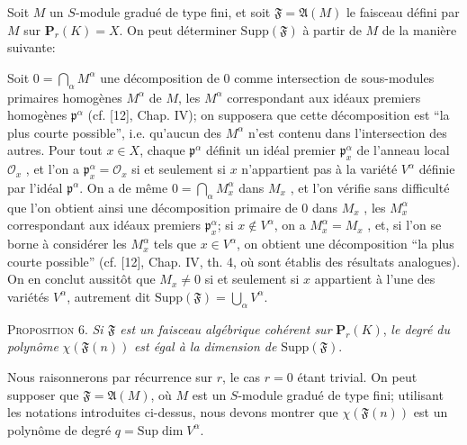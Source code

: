 Soit $M$ un $S$-module gradué de type fini, et soit $\mathfrak{F} = \mathfrak{A}(M)$ le faisceau défini par $M$ sur $\mathbf{P}_r(K) = X$. On peut déterminer $\mathrm{Supp}(\mathfrak{F})$ à partir de $M$ de la manière suivante:

Soit $0 = \bigcap_\alpha M^\alpha$ une décomposition de 0 comme intersection de sous-modules primaires homogènes $M^\alpha$ de $M$, les $M^\alpha$ correspondant aux idéaux premiers homogènes $\mathfrak{p}^\alpha$ (cf. [12], Chap. IV); on supposera que cette décomposition est ``la plus courte possible'', i.e. qu'aucun des $M^\alpha$ n'est contenu dans l'intersection des autres. Pour tout $x \in X$, chaque $\mathfrak{p}^\alpha$ définit un idéal premier $\mathfrak{p}_x^\alpha$ de l'anneau local $\mathcal{O}_x$ , et l'on a $\mathfrak{p}_x^\alpha = \mathcal{O}_x$ si et seulement si $x$ n'appartient pas à la variété $V^\alpha$ définie par l'idéal $\mathfrak{p}^\alpha$. On a de même $0 = \bigcap_\alpha M_x^\alpha$ dans $M_x$ , et l'on vérifie sans difficulté que l'on obtient ainsi une décomposition primaire de 0 dans $M_x$ , les $M_x^\alpha$ correspondant aux idéaux premiers $\mathfrak{p}_x^\alpha$; si $x \notin V^\alpha$, on a $M_x^\alpha = M_x$ , et, si l'on se borne à considérer les $M_x^\alpha$ tels que $x \in V^\alpha$, on obtient une décomposition ``la plus courte possible'' (cf. [12], Chap. IV, th. 4, où sont établis des résultats analogues). On en conclut aussitôt que $M_x \neq 0$ si et seulement si $x$ appartient à l'une des variétés $V^\alpha$, autrement dit $\mathrm{Supp}(\mathfrak{F}) = \bigcup_\alpha V^\alpha$.

\textsc{Proposition} 6. \textit{Si $\mathfrak{F}$ est un faisceau algébrique cohérent sur} $\mathbf{P}_r(K)$, \textit{le degré du polynôme} $\chi(\mathfrak{F}(n))$ \textit{est égal à la dimension de} $\mathrm{Supp}(\mathfrak{F})$.

Nous raisonnerons par récurrence sur $r$, le cas $r = 0$ étant trivial. On peut supposer que $\mathfrak{F} = \mathfrak{A}(M)$, où $M$ est un $S$-module gradué de type fini; utilisant les notations introduites ci-dessus, nous devons montrer que $\chi(\mathfrak{F}(n))$ est un polynôme de degré $q = \mathrm{Sup} \dim V^\alpha$.
